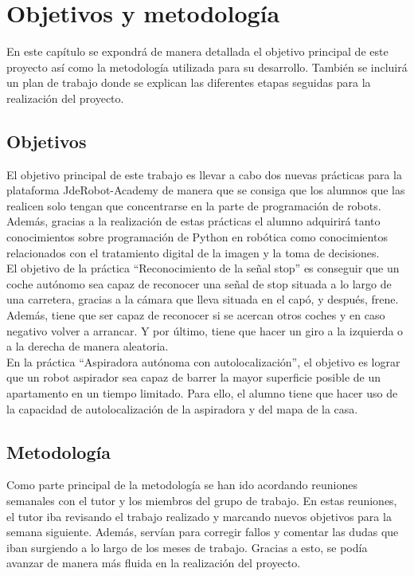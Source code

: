 \chapter{Objetivos y metodología}\label{cap.objetivos}
En este capítulo se expondrá de manera detallada el objetivo principal de este proyecto así como la metodología utilizada para su desarrollo. También se incluirá un plan de trabajo donde se explican las diferentes etapas seguidas para la realización del proyecto.

\section{Objetivos}

El objetivo principal de este trabajo es llevar a cabo dos nuevas prácticas para la plataforma JdeRobot-Academy de manera que se consiga que los alumnos que las realicen solo tengan que concentrarse en la parte de programación de robots. Además, gracias a la realización de estas prácticas el alumno adquirirá tanto conocimientos sobre programación de Python en robótica como conocimientos relacionados con el tratamiento digital de la imagen y la toma de decisiones. \\

El objetivo de la práctica ``Reconocimiento de la señal stop'' es conseguir que un coche autónomo sea capaz de reconocer una señal de stop situada a lo largo de una carretera, gracias a la cámara que lleva situada en el capó, y después, frene. Además, tiene que ser capaz de reconocer si se acercan otros coches y en caso negativo volver a arrancar. Y por último, tiene que hacer un giro a la izquierda o a la derecha de manera aleatoria. \\

En la práctica ``Aspiradora autónoma con autolocalización'', el objetivo es lograr que un robot aspirador sea capaz de barrer la mayor superficie posible de un apartamento en un tiempo limitado. Para ello, el alumno tiene que hacer uso de la capacidad de autolocalización de la aspiradora y del mapa de la casa.

\section{Metodología}
Como parte principal de la metodología se han ido acordando reuniones semanales con el tutor y los miembros del grupo de trabajo. En estas reuniones, el tutor iba revisando el trabajo realizado y marcando nuevos objetivos para la semana siguiente. Además, servían para corregir fallos y comentar las dudas que iban surgiendo a lo largo de los meses de trabajo. Gracias a esto, se podía avanzar de manera más fluida en la realización del proyecto. \\

